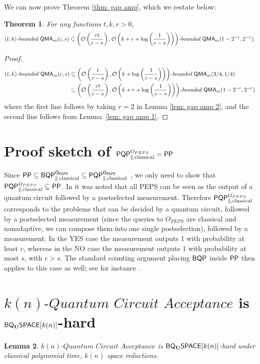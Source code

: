 \documentclass[11pt]{article}
\newtheorem{theorem}{Theorem}
\newtheorem{lemma}[theorem]{Lemma}
\theoremstyle{definition}
\theoremstyle{remark}
\newcommand\QMA{{\sf{QMA}}}
\newcommand\PP{\sf{PP}}
\newcommand\BQP{{\sf{BQP}}}
\newcommand\PQP{{\sf{PQP}}}
\newcommand\bddQMA[5]{{\left(#1,#2\right)}\textit{-bounded }\QMA_{#3}(#4,#5)}
\newcommand\qca[1]{\ensuremath{#1}\textit{-Quantum Circuit Acceptance}}
\newcommand{\classfont}{\sf}
\newcommand{\Unitary}{\mathbf{U}}
\newcommand{\unitaryBQSPACE}[1]{{\classfont{BQ}_\Unitary\classfont{SPACE}}[#1]}
\begin{document}
We can now prove Theorem \ref{thm: gap amp}, which we restate below:
\begingroup
\def\thetheorem{\ref{thm: gap amp}}
\begin{theorem}
For any functions $t,k,r>0$, 
\[
\bddQMA{t}{k}{m}{c}{s}\subseteq\bddQMA{\mathcal{O}\left(\frac{rt}{c-s}\right)}{\mathcal{O}\left(k+r+\log\left(\frac{1}{c-s}\right)\right)}{m}{1-2^{-r}}{2^{-r}}.
\]
\end{theorem}
\addtocounter{theorem}{-1}
\endgroup

\begin{proof}
\begin{align}
\bddQMA{t}{k}{m}{c}{s} &\subseteq \bddQMA{\mathcal{O}\left(\frac{t}{c-s}\right)}{\mathcal{O}\left(k+\log\left(\frac{1}{c-s}\right)\right)}{m}{3/4}{1/4}  \nonumber \\
&\subseteq \bddQMA{\mathcal{O}\left(\frac{rt}{c-s}\right)}{\mathcal{O}\left(k+r+\log\left(\frac{1}{c-s}\right)\right)}{m}{1-2^{-r}}{2^{-r}} \nonumber
\end{align}
where the first line follows by taking $r=2$ in Lemma \ref{lem: gap amp 2}, and the second line follows from Lemma~\ref{lem: gap amp 1}.
\end{proof}

\section{Proof sketch of $\PQP^{O_{PEPS}}_{\parallel,\text{classical}} = \PP$} \label{app:peps}
Since $\PP \subseteq \BQP^{O_{PEPS}}_{\parallel,\text{classical}} \subseteq \PQP^{O_{PEPS}}_{\parallel,\text{classical}}$ \cite{swv07}, we only need to show that $\PQP^{O_{PEPS}}_{\parallel,\text{classical}} \subseteq \PP$. In \cite{swv07} it was noted that all PEPS can be seen as the output of a quantum circuit followed by a postselected measurement. Therefore $\PQP^{O_{PEPS}}_{\parallel,\text{classical}}$ corresponds to the problems that can be decided by a quantum circuit, followed by a postselected measurement (since the queries to $O_{PEPS}$ are classical and nonadaptive, we can compose them into one single postselection), followed by a measurement. In the YES case the measurement outputs 1 with probability at least $c$, whereas in the NO case the measurement outputs 1 with probability at most $s$, with $c > s$. The standard counting argument placing $\BQP$ inside $\PP$ then applies to this case as well; see for instance \cite[Propositions~2~and~3]{aaronson05}.


\section{$\qca{k(n)}$ is $\unitaryBQSPACE{k(n)}$-hard}\label{app:qca}
\begingroup
\def\thelemma{\ref{lem: quantum circuit acceptance}}
\begin{lemma}
$\qca{k(n)}$ is $\unitaryBQSPACE{k(n)}$-hard under classical polynomial time, $k(n)$ space reductions.
\end{lemma}
\addtocounter{theorem}{-1}
\endgroup
\end{document}
